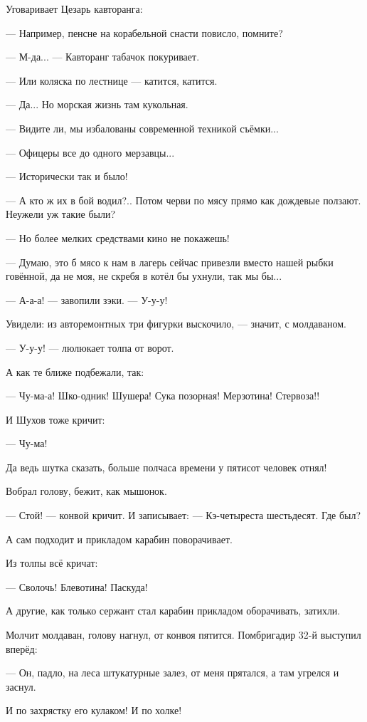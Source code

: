 Уговаривает Цезарь кавторанга:

--- Например, пенсне на корабельной снасти повисло, помните?

--- М-да... --- Кавторанг табачок покуривает.

--- Или коляска по лестнице --- катится, катится.

--- Да... Но морская жизнь там кукольная.

--- Видите ли, мы избалованы современной техникой съёмки...

--- Офицеры все до одного мерзавцы...

--- Исторически так и было!

--- А кто ж их в бой водил?.. Потом черви по мясу прямо как дождевые ползают. Неужели уж такие
были?

--- Но более мелких средствами кино не покажешь!

--- Думаю, это б мясо к нам в лагерь сейчас привезли вместо нашей рыбки говённой, да не моя, не
скребя в котёл бы ухнули, так мы бы...

--- А-а-а! --- завопили зэки. --- У-у-у!

Увидели: из авторемонтных три фигурки выскочило, --- значит, с молдаваном.

--- У-у-у! --- люлюкает толпа от ворот.

А как те ближе подбежали, так:

--- Чу-ма-а! Шко-одник! Шушера! Сука позорная! Мерзотина! Стервоза!!

И Шухов тоже кричит:

--- Чу-ма!

Да ведь шутка сказать, больше полчаса времени у пятисот человек отнял!

Вобрал голову, бежит, как мышонок.

--- Стой! --- конвой кричит. И записывает: --- Кэ-четыреста шестьдесят. Где был?

А сам подходит и прикладом карабин поворачивает.

Из толпы всё кричат:

--- Сволочь! Блевотина! Паскуда!

А другие, как только сержант стал карабин прикладом оборачивать, затихли.

Молчит молдаван, голову нагнул, от конвоя пятится. Помбригадир 32-й выступил вперёд:

--- Он, падло, на леса штукатурные залез, от меня прятался, а там угрелся и заснул.

И по захрястку его кулаком! И по холке!

